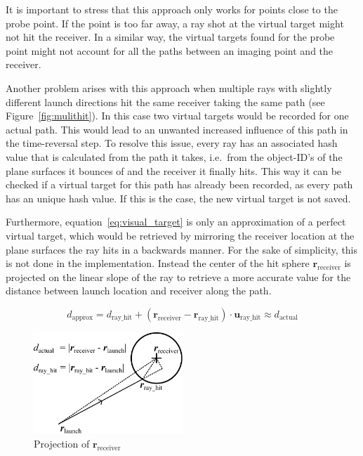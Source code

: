 It is important to stress that this approach only works for points close to the probe point.
If the point is too far away, a ray shot at the virtual target might not hit the receiver.
In a similar way, the virtual targets found for the probe point might not account for all the paths between an imaging point and the receiver.

Another problem arises with this approach when multiple rays with slightly different launch directions hit the same receiver taking the same path (see Figure~\ref{fig:mulithit}).
In this case two virtual targets would be recorded for one actual path.
This would lead to an unwanted increased influence of this path in the time-reversal step.
To resolve this issue, every ray has an associated hash value that is calculated from the path it takes, i.e.~from the object-ID's of the plane surfaces it bounces of and the receiver it finally hits.
This way it can be checked if a virtual target for this path has already been recorded, as every path has an unique hash value.
If this is the case, the new virtual target is not saved.

Furthermore, equation~\eqref{eq:visual_target} is only an approximation of a perfect virtual target, which would be retrieved by mirroring the receiver location at the plane surfaces the ray hits in a backwards manner.
For the sake of simplicity, this is not done in the implementation.
Instead the center of the hit sphere \(\bm{r}_{\text{receiver}}\) is projected on the linear slope of the ray to retrieve a more accurate value for the distance between launch location and receiver along the path.

\begin{equation}
    d_{\text{approx}} = d_{\text{ray\_hit}} +  (\bm{r}_{\text{receiver}} - \bm{r}_{\text{ray\_hit}}) \cdot \bm{u}_{\text{ray\_hit}} \approx d_{\text{actual}}
\end{equation}

\begin{figure}[h]
    \centering
    \includegraphics[width=0.5\textwidth]{figures/d_approx.pdf}
    \caption{Projection of \(\bm{r}_{\text{receiver}}\)}\label{fig:d_approx}
\end{figure}

